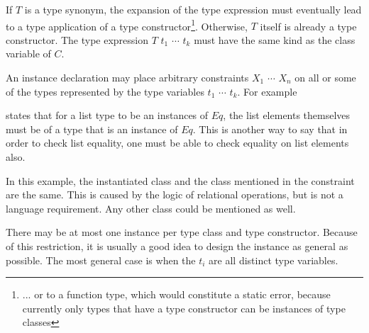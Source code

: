 If $T$ is a type synonym, the expansion of the type expression must eventually lead to a type application of a type constructor\footnote{... or to a function type, which would constitute a static error, because currently only types that have a type constructor can be instances of type classes}. Otherwise, $T$ itself is already a type constructor. The type expression $T$ $t_1$ $\cdots$ $t_k$ must have the same kind as the class variable of $C$.

An instance declaration may place arbitrary constraints $X_1$ $\cdots$ $X_n$ on all or some of the types represented by the type variables $t_1$ $\cdots$ $t_k$. For example


states that for a list type to be an instances of $Eq$, the list elements themselves must be of a type that is an instance of $Eq$. This is another way to say that in order to check list equality, one must be able to check equality on list elements also.

In this example, the instantiated class and the class mentioned in the constraint are the same. This is caused by the logic of relational operations, but is not a language requirement. Any other class could be mentioned as well.

There may be at most one instance per type class and type constructor. Because of this restriction, it is usually a good idea to design the instance as general as possible. The most general case is when the $t_i$ are all distinct type variables.



